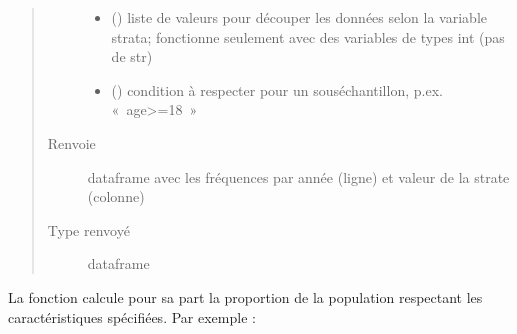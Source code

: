\documentclass[letterpaper,10pt,french]{sphinxmanual}
\begin{document}
\begin{fulllineitems}
\begin{fulllineitems}
\begin{quote}
\begin{description}
\begin{itemize}
\item {} 
 () \textendash{} liste de valeurs pour découper les données selon la variable strata; fonctionne seulement avec des variables de types int (pas de str)

\item {} 
 () \textendash{} condition à respecter pour un sous\sphinxhyphen{}échantillon, p.ex. « age\textgreater{}=18 »

\end{itemize}

\item[{Renvoie}] \leavevmode
dataframe avec les fréquences par année (ligne) et valeur de la strate (colonne)

\item[{Type renvoyé}] \leavevmode
dataframe

\end{description}\end{quote}

\end{fulllineitems}


\end{fulllineitems}


\begin{DUlineblock}{0em}
\item[] 
\end{DUlineblock}

La fonction  calcule pour sa part la proportion de la population respectant les caractéristiques spécifiées. Par exemple :

\begin{sphinxVerbatim}[commandchars=\\\{\}]
   
\end{sphinxVerbatim}

\end{document}
